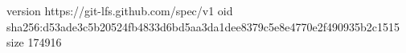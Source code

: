 version https://git-lfs.github.com/spec/v1
oid sha256:d53ade3c5b20524fb4833d6bd5aa3da1dee8379c5e8e4770e2f490935b2c1515
size 174916

